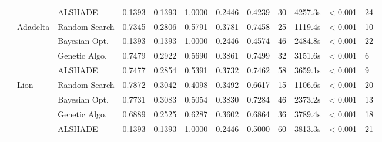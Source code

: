 \documentclass[conference]{IEEEtran}
\begin{document}
\begin{table}[t]
\begin{tabular}{llllllllllll}
 &  & ALSHADE & 0.1393 & 0.1393 & 1.0000 & 0.2446 & 0.4239 & 30 & 4257.3s & < 0.001 & 24 \\
\cline{2-12}
 & \multirow{4}{*}{ Adadelta} & Random Search & 0.7345 & 0.2806 & 0.5791 & 0.3781 & 0.7458 & 25 & 1119.4s & < 0.001 & 10 \\
 &  & Bayesian Opt. & 0.1393 & 0.1393 & 1.0000 & 0.2446 & 0.4574 & 46 & 2484.8s & < 0.001 & 22 \\
 &  & Genetic Algo. & 0.7479 & 0.2922 & 0.5690 & 0.3861 & 0.7499 & 32 & 3151.6s & < 0.001 & 6 \\
 &  & ALSHADE & 0.7477 & 0.2854 & 0.5391 & 0.3732 & 0.7462 & 58 & 3659.1s & < 0.001 & 9 \\
\cline{2-12}
 & \multirow{4}{*}{ Lion} & Random Search & 0.7872 & 0.3042 & 0.4098 & 0.3492 & 0.6617 & 15 & 1106.6s & < 0.001 & 20 \\
 &  & Bayesian Opt. & 0.7731 & 0.3083 & 0.5054 & 0.3830 & 0.7284 & 46 & 2373.2s & < 0.001 & 13 \\
 &  & Genetic Algo. & 0.6889 & 0.2525 & 0.6287 & 0.3602 & 0.6864 & 36 & 3789.4s & < 0.001 & 18 \\
 &  & ALSHADE & 0.1393 & 0.1393 & 1.0000 & 0.2446 & 0.5000 & 60 & 3813.3s & < 0.001 & 21 \\
\bottomrule
\end{tabular}
\end{table}
\end{document}
